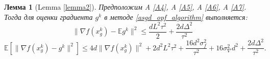 \documentclass{article}
\newtheorem{lemma}{Лемма}
\begin{document}
\begin{lemma}[Lemma \ref{lemma2}]\label{lemma2_appendix}
Предположим A \ref{A4}, A \ref{A5}, A \ref{A6}, A \ref{A7}. Тогда для оценки градиента $g^k$ в методе \ref{asgd_opf_algorithm} выполняется:
\begin{equation}
    \|\nabla f(x_g^k) - \mathbb{E}g^k\|^2 \leqslant \frac{d L^2 \tau^2}{2} + \frac{2d\Delta^2}{\tau^2}
    \label{norm_of_expectation_stochastic_opf_appendix}
\end{equation}
\begin{equation}
    \mathbb{E}[\|\nabla f(x_g^k) - g^k\|^2] \leqslant 4d \|\nabla f(x_g^k)\|^2 + 2 d^2 L^2 \tau^2 + \frac{16 d^2 \sigma_f^2}{\tau^2} + 16 \sigma_\nabla^2 d^2 + \frac{2d \Delta^2}{\tau^2}.
    \label{expectation_of_norm_stochastic_opf_appendix}
\end{equation}
\end{lemma}
\end{document}

